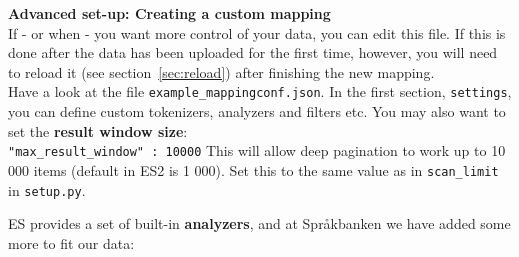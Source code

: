 \documentclass[
12pt, %
a4paper, %
oneside, %
headinclude,footinclude, %
BCOR0mm, %
]{scrartcl}
\begin{document}
%
%
  \textbf{Advanced set-up: Creating a custom mapping}\\
  If - or when - you want more control of your data, you can edit this file. If
  this is done after the data has been uploaded for the first time, however, you will need to
  reload it (see section~\ref{sec:reload}) after finishing the new mapping.\\
  Have a look at the file \verb|example_mappingconf.json|.
  In the first section, \verb|settings|, you can define custom
  tokenizers, analyzers and filters etc. You may also want to set the \textbf{result window size}:\\
  \verb|"max_result_window" : 10000|
  This will allow deep pagination to work up to 10 000 items (default in ES2 is 1 000). Set this to the
  same value as in \verb|scan_limit| in \verb|setup.py|.

  ES provides a set of built-in
  \textbf{analyzers}, and at Språkbanken we have added some more to fit our data:\\
\end{document}
